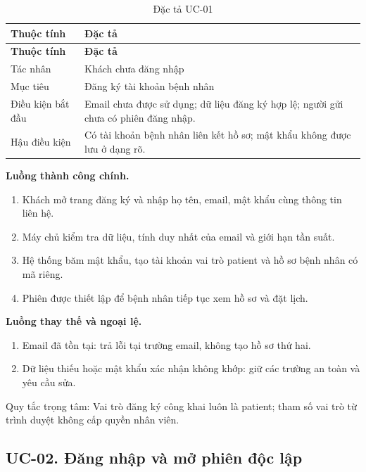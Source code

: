 {\small\setlength{\tabcolsep}{3pt}\renewcommand{\arraystretch}{1.12}
\begin{longtable}{@{}L{\textwidth-1.32pt\relax} L{\textwidth-4.68pt\relax}@{}}
\caption{Đặc tả UC-01}\\
\toprule
\textbf{Thuộc tính} & \textbf{Đặc tả}\\\midrule
\endfirsthead
\toprule
\textbf{Thuộc tính} & \textbf{Đặc tả}\\\midrule
\endhead
\bottomrule\endlastfoot
Tác nhân & Khách chưa đăng nhập\\[3pt]
Mục tiêu & Đăng ký tài khoản bệnh nhân\\[3pt]
Điều kiện bắt đầu & Email chưa được sử dụng; dữ liệu đăng ký hợp lệ; người gửi chưa có phiên đăng nhập.\allowbreak{}\\[3pt]
Hậu điều kiện & Có tài khoản bệnh nhân liên kết hồ sơ; mật khẩu không được lưu ở dạng rõ.\allowbreak{}\\[3pt]
\end{longtable}}
\noindent\textbf{Luồng thành công chính.}
\begin{enumerate}
\item Khách mở trang đăng ký và nhập họ tên, email, mật khẩu cùng thông tin liên hệ.\allowbreak{}
\item Máy chủ kiểm tra dữ liệu, tính duy nhất của email và giới hạn tần suất.\allowbreak{}
\item Hệ thống băm mật khẩu, tạo tài khoản vai trò patient và hồ sơ bệnh nhân có mã riêng.\allowbreak{}
\item Phiên được thiết lập để bệnh nhân tiếp tục xem hồ sơ và đặt lịch.\allowbreak{}
\end{enumerate}
\noindent\textbf{Luồng thay thế và ngoại lệ.}
\begin{enumerate}
\item Email đã tồn tại:\allowbreak{} trả lỗi tại trường email, không tạo hồ sơ thứ hai.\allowbreak{}
\item Dữ liệu thiếu hoặc mật khẩu xác nhận không khớp:\allowbreak{} giữ các trường an toàn và yêu cầu sửa.\allowbreak{}
\end{enumerate}
Quy tắc trọng tâm:\allowbreak{} Vai trò đăng ký công khai luôn là patient; tham số vai trò từ trình duyệt không cấp quyền nhân viên.\allowbreak{}

\clearpage

\subsection{UC-02.\allowbreak{} Đăng nhập và mở phiên độc lập}
\label{uc:2}

